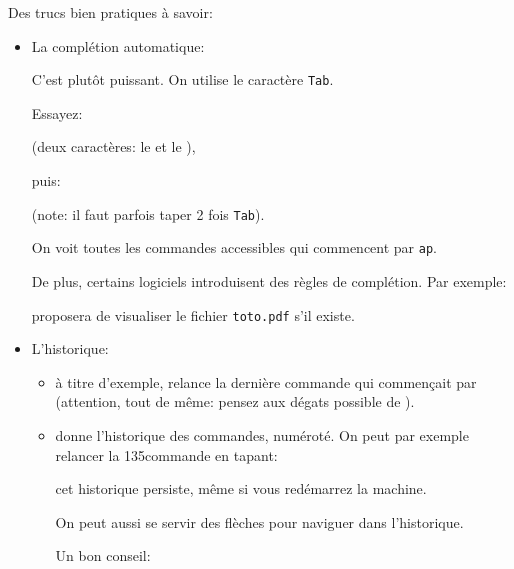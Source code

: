 Des trucs bien pratiques à savoir:
\begin{itemize}
\item La complétion automatique:

  C'est plutôt puissant. On utilise le caractère \texttt{Tab}.

  Essayez:

    (deux caractères: le  et le ),

  puis:

   (note: il faut parfois taper 2 fois
  \texttt{Tab}).

  On voit toutes les commandes accessibles qui commencent par
  \texttt{ap}.

  De plus, certains logiciels introduisent des règles de
  complétion. Par exemple:


  proposera de visualiser le fichier \texttt{toto.pdf}
    s'il existe.
  \item L'historique:
    \begin{itemize}
      \item à titre d'exemple,  relance la dernière
        commande qui commençait 
        par  (attention, tout de même: pensez aux dégats
        possible de ). 
      \item {} donne l'historique des commandes, numéroté.
        On peut par exemple relancer la 135\ieme commande en tapant:


        cet historique persiste, même si vous redémarrez la machine.

        On peut aussi se servir des flèches pour naviguer dans
        l'historique.

        Un bon conseil: 
        

    \end{itemize}
\end{itemize}

